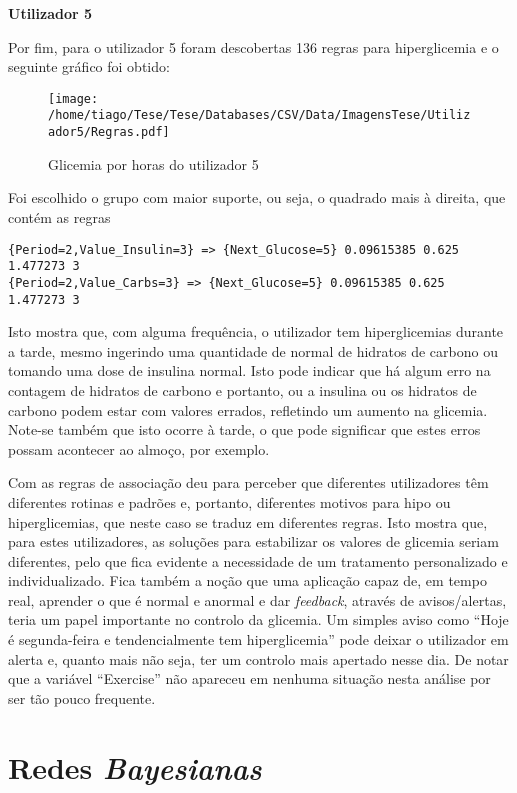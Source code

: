 \textbf{Utilizador 5}

Por fim, para o utilizador 5 foram descobertas 136 regras para hiperglicemia e o seguinte gráfico foi obtido:

\begin{figure}[H]
\centering
\texttt{[image: /home/tiago/Tese/Tese/Databases/CSV/Data/ImagensTese/Utilizador5/Regras.pdf]}
\caption{Glicemia por horas do utilizador 5}
\end{figure}
Foi escolhido o grupo com maior suporte, ou seja, o quadrado mais à direita, que contém as regras

\begin{lstlisting}
{Period=2,Value_Insulin=3} => {Next_Glucose=5} 0.09615385 0.625      1.477273 3    
{Period=2,Value_Carbs=3} => {Next_Glucose=5} 0.09615385 0.625      1.477273 3    
\end{lstlisting}
Isto mostra que, com alguma frequência, o utilizador tem hiperglicemias durante a tarde, mesmo ingerindo uma quantidade de normal de hidratos de carbono ou tomando uma dose de insulina normal. Isto pode indicar que há algum erro na contagem de hidratos de carbono e portanto, ou a insulina ou os hidratos de carbono podem estar com valores errados, refletindo um aumento na glicemia. Note-se também que isto ocorre à tarde, o que pode significar que estes erros possam acontecer ao almoço, por exemplo.\newline

Com as regras de associação deu para perceber que diferentes utilizadores têm diferentes rotinas e padrões e, portanto, diferentes motivos para hipo ou hiperglicemias, que neste caso se traduz em diferentes regras. Isto mostra que, para estes utilizadores, as soluções para estabilizar os valores de glicemia seriam diferentes, pelo que fica evidente a necessidade de um tratamento personalizado e individualizado. Fica também a noção que uma aplicação capaz de, em tempo real, aprender o que é normal e anormal e dar \textit{feedback}, através de avisos/alertas, teria um papel importante no controlo da glicemia. Um simples aviso como ``Hoje é segunda-feira e tendencialmente tem hiperglicemia'' pode deixar o utilizador em alerta e, quanto mais não seja, ter um controlo mais apertado nesse dia.
De notar que a variável ``Exercise'' não apareceu em nenhuma situação nesta análise por ser tão pouco frequente.

\section{Redes \textit{Bayesianas}}

